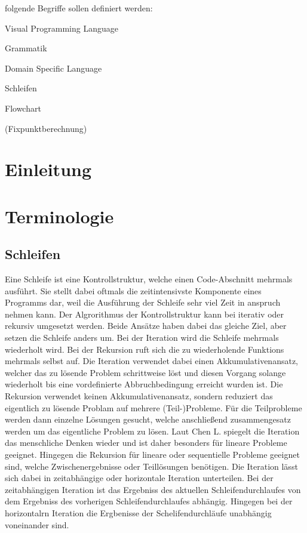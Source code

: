 \documentclass{article}
\begin{document}
    folgende Begriffe sollen definiert werden:

    Visual Programming Language

    Grammatik

    Domain Specific Language

    Schleifen

    Flowchart

    (Fixpunktberechnung)
    \newpage
    \tableofcontents
    \newpage
    \section{Einleitung}
    \newpage
    \section{Terminologie}
    \subsection{Schleifen}
    Eine Schleife ist eine Kontrollstruktur, welche einen Code-Abschnitt mehrmals ausführt. \cite{22}
    Sie stellt dabei oftmals die zeitintensivste Komponente eines Programms dar, weil die Ausführung der Schleife sehr viel Zeit in anspruch nehmen kann. \cite{1}
    Der Algrorithmus der Kontrollstruktur kann bei iterativ oder rekursiv umgesetzt werden. Beide Ansätze haben dabei das gleiche Ziel, aber setzen die Schleife anders um. Bei der Iteration wird die Schleife mehrmals wiederholt wird. Bei der Rekursion ruft sich die zu wiederholende Funktions mehrmals selbst auf.
    Die Iteration verwendet dabei einen Akkumulativenansatz, welcher das zu lösende Problem schrittweise löst und diesen Vorgang solange wiederholt bis eine vordefinierte Abbruchbedingung erreicht wurden ist.
    Die Rekursion verwendet keinen Akkumulativenansatz, sondern reduziert das eigentlich zu lösende Problam auf mehrere (Teil-)Probleme. Für die Teilprobleme werden dann einzelne Lösungen gesucht, welche anschließend zusammengesatz werden um das eigentliche Problem zu lösen. \cite{3}
    Laut Chen L. spiegelt die Iteration das menschliche Denken wieder und ist daher besonders für lineare Probleme geeignet. Hingegen die Rekursion für lineare oder sequentielle Probleme geeignet sind, welche Zwischenergebnisse oder Teillösungen benötigen. \cite{3}
    Die Iteration lässt sich dabei in zeitabhängige oder horizontale Iteration unterteilen. Bei der zeitabhängigen Iteration ist das Ergebniss des aktuellen Schleifendurchlaufes von dem Ergebniss des vorherigen Schleifendurchlaufes abhängig. Hingegen bei der horizontalrn Iteration die Ergbenisse der Schelifendurchläufe unabhängig voneinander sind. \cite{5}
\end{document}
